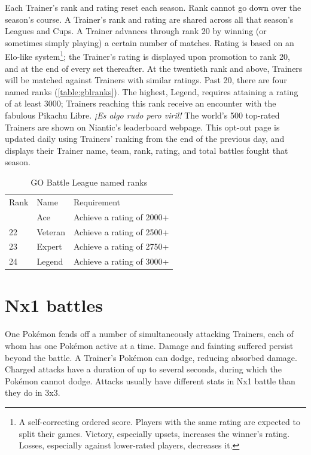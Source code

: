 Each Trainer's rank and rating reset each season.
Rank cannot go down over the season's course.
A Trainer's rank and rating are shared across all that season's Leagues and Cups.
A Trainer advances through rank 20 by winning (or sometimes simply playing) a certain number of matches.
Rating is based on an Elo-like system\footnote{A self-correcting ordered score.
Players with the same rating are expected to split their games.
Victory, especially upsets, increases the winner's rating.
Losses, especially against lower-rated players, decreases it.}; the Trainer's rating is displayed upon promotion to rank 20, and at the end of every set thereafter.
At the twentieth rank and above, Trainers will be matched against Trainers with similar ratings.
Past 20, there are four named ranks (\autoref{table:gblranks}).
The highest, Legend, requires attaining a rating of at least 3000;
 Trainers reaching this rank receive an encounter with the
 fabulous Pikachu Libre. \textit{¡Es algo rudo pero viril!}
The world's 500 top-rated Trainers are shown on Niantic's leaderboard webpage.
This opt-out page is updated daily using Trainers' ranking from the end of the previous day,
 and displays their Trainer name, team, rank, rating, and total battles fought that season.
\begin{table}
\centering
\begin{tabular}{lll}
Rank & Name & Requirement\\
\Midrule
  21 & Ace & Achieve a rating of 2000+\\
  22 & Veteran & Achieve a rating of 2500+\\
  23 & Expert & Achieve a rating of 2750+\\
  24 & Legend & Achieve a rating of 3000+\\
\end{tabular}
  \caption{GO Battle League named ranks\label{table:gblranks}}
\end{table}

\section{Nx1 battles\label{sec:nx1}}
One Pokémon fends off a number of simultaneously attacking Trainers, each of whom has one Pokémon active at a time.
Damage and fainting suffered persist beyond the battle.
A Trainer's Pokémon can dodge, reducing absorbed damage.
Charged attacks have a duration of up to several seconds, during which the Pokémon cannot dodge.
Attacks usually have different stats in Nx1 battle than they do in 3x3.

